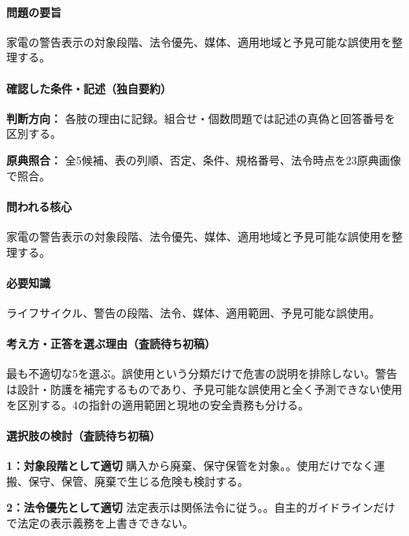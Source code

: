\paragraph{問題の要旨} 家電の警告表示の対象段階、法令優先、媒体、適用地域と予見可能な誤使用を整理する。

\paragraph{確認した条件・記述（独自要約）}\mbox{}\par

\noindent\textbf{判断方向：} 各肢の理由に記録。組合せ・個数問題では記述の真偽と回答番号を区別する。\par

\noindent\textbf{原典照合：} 全5候補、表の列順、否定、条件、規格番号、法令時点を23原典画像で照合。\par

\paragraph{問われる核心} 家電の警告表示の対象段階、法令優先、媒体、適用地域と予見可能な誤使用を整理する。

\paragraph{必要知識} ライフサイクル、警告の段階、法令、媒体、適用範囲、予見可能な誤使用。

\paragraph{考え方・正答を選ぶ理由（査読待ち初稿）} 最も不適切な5を選ぶ。誤使用という分類だけで危害の説明を排除しない。警告は設計・防護を補完するものであり、予見可能な誤使用と全く予測できない使用を区別する。4の指針の適用範囲と現地の安全責務も分ける。

\paragraph{選択肢の検討（査読待ち初稿）}\mbox{}\par

\noindent\textbf{1：対象段階として適切} 購入から廃棄、保守保管を対象。。使用だけでなく運搬、保守、保管、廃棄で生じる危険も検討する。\par

\noindent\textbf{2：法令優先として適切} 法定表示は関係法令に従う。。自主的ガイドラインだけで法定の表示義務を上書きできない。\par

